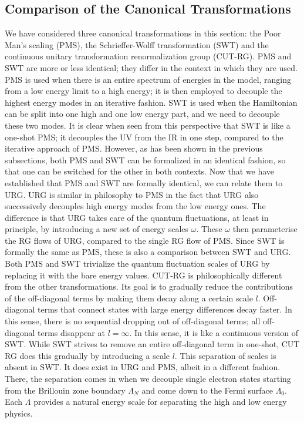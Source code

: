 \documentclass[12pt,twoside]{article}
\numberwithin{equation}{section}
\begin{document}
\subsection{Comparison of the Canonical Transformations}
We have considered three canonical transformations in this section: the Poor Man's scaling (PMS), the Schrieffer-Wolff transformation (SWT) and the continuous unitary transformation renormalization group (CUT-RG). PMS and SWT are more or less identical; they differ in the context in which they are used. PMS is used when there is an entire spectrum of energies in the model, ranging from a low energy limit to a high energy; it is then employed to decouple the highest energy modes in an iterative fashion. SWT is used when the Hamiltonian can be split into one high and one low energy part, and we need to decouple these two modes. It is clear when seen from this perspective that SWT is like a one-shot PMS; it decouples the UV from the IR in one step, compared to the iterative approach of PMS. However, as has been shown in the previous subsections, both PMS and SWT can be formalized in an identical fashion, so that one can be switched for the other in both contexts.
\pb Now that we have established that PMS and SWT are formally identical, we can relate them to URG. URG is similar in philosophy to PMS in the fact that URG also successively decouples high energy modes from the low energy ones. The difference is that URG takes care of the quantum fluctuations, at least in principle, by introducing a new set of energy scales \(\omega\). These \(\omega\) then parameterise the RG flows of URG, compared to the single RG flow of PMS. Since SWT is formally the same as PMS, these is also a comparison between SWT and URG. Both PMS and SWT trivialize the quantum fluctuation scales of URG by replacing it with the bare energy values.
\pb CUT-RG is philosophically different from the other transformations. Its goal is to gradually reduce the contributions of the off-diagonal terms by making them decay along a certain scale \(l\). Off-diagonal terms that connect states with large energy differences decay faster. In this sense, there is no sequential dropping out of off-diagonal terms; all off-diagonal terms disappear at \(l=\infty\). In this sense, it is like a continuous version of SWT. While SWT strives to remove an entire off-diagonal term in one-shot, CUT RG does this gradually by introducing a scale \(l\). This separation of scales is absent in SWT. It does exist in URG and PMS, albeit in a different fashion. There, the separation comes in when we decouple single electron states starting from the Brillouin zone boundary \(\Lambda_N\) and come down to the Fermi surface \(\Lambda_0\). Each \(\Lambda\) provides a natural energy scale for separating the high and low energy physics.
\end{document}
